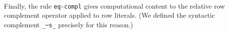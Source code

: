 \documentclass[authoryear, acmsmall, screen, review, nonacm]{acmart} %
\begin{document}
\begin{code}
\AgdaSpace{}%
\AgdaSpace{}%
\AgdaSymbol{\}}\AgdaSpace{}%
\AgdaSymbol{\{}\AgdaSpace{}%
\AgdaSymbol{:}\AgdaSpace{}%
\AgdaSpace{}%
\AgdaSymbol{(}\AgdaSpace{}%
\AgdaSymbol{)\}}\AgdaSpace{}%
\<%
\\
\>[4][@{}l@{\AgdaIndent{0}}]%
\>[8]\AgdaSymbol{(}\AgdaSpace{}%
\AgdaSymbol{\{}\AgdaSpace{}%
\AgdaSymbol{=}\AgdaSpace{}%
\AgdaSymbol{\}}\AgdaSpace{}%
\AgdaSpace{}%
\AgdaSymbol{)}\AgdaSpace{}%
\AgdaSpace{}%
\AgdaSpace{}%
\AgdaSpace{}%
\AgdaSpace{}%
\AgdaSymbol{\{}\AgdaSpace{}%
\AgdaSymbol{=}\AgdaSpace{}%
\AgdaSymbol{\}}\AgdaSpace{}%
\AgdaSpace{}%
\AgdaSymbol{(}\AgdaSpace{}%
\AgdaSpace{}%
\AgdaSymbol{)}\<%
\end{code}

\Ni Finally, the rule \verb!eq-compl! gives computational content to the relative row complement operator applied to row literals. (We defined the syntactic complement \verb!_─s_! precisely for this reason.)
\end{document}
